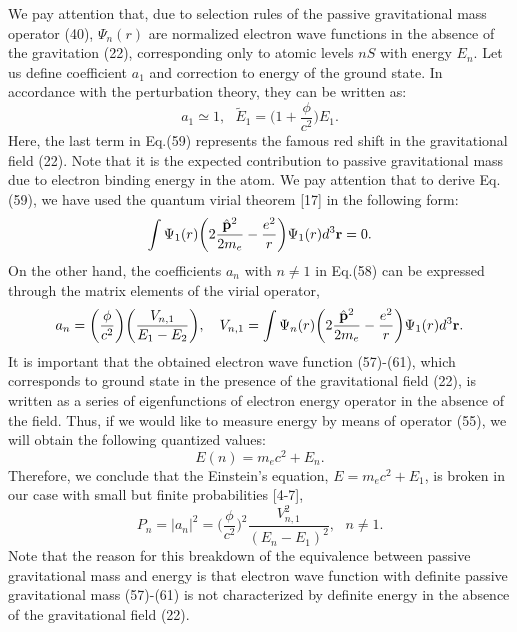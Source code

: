 \documentclass{ws-ijmpd}
\begin{document}
We pay attention that, due to selection rules of the passive
 gravitational mass operator (40), $\Psi_n (r)$ are normalized 
 electron wave functions in the absence of the gravitation
(22), corresponding only to atomic levels $nS$ with energy $E_n$. 
Let us define coefficient $a_1$ and correction to energy of the 
ground state. In accordance with the perturbation theory, they can
be written as:
\begin{equation}
a_1 \simeq 1, \ \ \ \tilde E_1 = \biggl(1 + \frac{\phi}{c^2}
\biggl) E_1 .
\end{equation}
Here, the last term in Eq.(59) represents the famous red shift
in the gravitational field (22). Note that it is the expected contribution to passive gravitational mass due to electron binding
energy in the atom. We pay attention that to derive Eq.(59), we have
used the quantum virial theorem [17] in the following form:
\begin{equation}
\int \Psi_1(r) \biggl( 2 \frac{\hat {\bf p}^2}{2 m_e} -
\frac{e^2}{r} \biggl) \Psi_1(r) d^3 {\bf r} = 0 .
\end{equation}
On the other hand, the coefficients $a_n$ with $n \neq 1$ in Eq.(58) can be expressed through the matrix elements of the virial operator,
\begin{equation}
a_n = \biggl( \frac{\phi}{c^2} \biggl) \biggl(
\frac{V_{n,1}}{E_1-E_2} \biggl), \ \ \ V_{n,1} = \int \Psi_n(r)
\biggl( 2 \frac{\hat {\bf p}^2}{2 m_e} - \frac{e^2}{r} \biggl)
\Psi_1(r) d^3 {\bf r} .
\end{equation}
It is important that the obtained electron wave function (57)-(61),
 which corresponds to ground state in the presence of the gravitational
field (22), is written as a series of eigenfunctions of electron energy
operator in the absence of the field. Thus, if we would like to measure
energy by means of operator (55), we will obtain the following
 quantized values:
\begin{equation}
E(n) = m_e c^2 + E_n .
\end{equation}
Therefore, we conclude that the Einstein's equation, $E = m_e c^2 + E_1$, is broken in our case with small but finite probabilities [4-7],
\begin{equation}
P_n = |a_n|^2 = \biggl(\frac{\phi}{c^2}\biggl)^2
\frac{V^2_{n,1}}{(E_n -E_1)^2} , \ \ \ n \neq 1 .
\end{equation}
Note that the reason for this breakdown of the equivalence between
passive gravitational mass and energy is that electron wave function
 with definite passive gravitational mass (57)-(61) is not characterized by definite energy in the absence of the gravitational field (22). 
\end{document}
